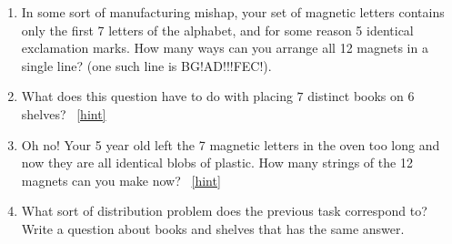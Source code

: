 \documentclass{book}
\begin{document}
\setcounter{project}{125}
\addtocounter{project}{-1}
\begin{activity}[]\label{activity-118}
\leavevmode%
\begin{enumerate}[font=\bfseries,label=(\alph*),ref=\alph*]
\item\label{task-170} \hypertarget{p-889}{}%
In some sort of manufacturing mishap, your set of magnetic letters contains only the first 7 letters of the alphabet, and for some reason 5 identical exclamation marks.  How many ways can you arrange all 12 magnets in a single line?  (one such line is BG!AD!!!FEC!).%
\item\label{task-171} \hypertarget{p-892}{}%
What does this question have to do with placing \(7\) distinct books on \(6\) shelves?%
~\hfill{\tiny\hyperlink{a-125.b}{[hint]}\hypertarget{q-125.b}{}}\item\label{task-172} \hypertarget{p-896}{}%
Oh no! Your 5 year old left the 7 magnetic letters in the oven too long and now they are all identical blobs of plastic.  How many strings of the 12 magnets can you make now?%
~\hfill{\tiny\hyperlink{a-125.c}{[hint]}\hypertarget{q-125.c}{}}\item\label{task-173} \hypertarget{p-899}{}%
What sort of distribution problem does the previous task correspond to?  Write a question about books and shelves that has the same answer.%
\end{enumerate}
\end{activity}
\end{document}
